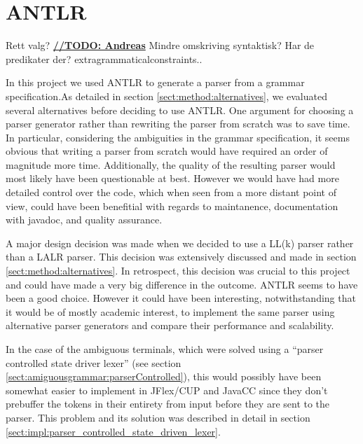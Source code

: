 \section{ANTLR}
Rett valg?
\underline{\textbf{\LARGE //TODO: Andreas}} Mindre omskriving syntaktisk? Har de predikater der? extragrammaticalconstraints..

In this project we used ANTLR to generate a parser from a grammar
specification.As detailed in section \ref{sect:method:alternatives}, we
evaluated several alternatives before deciding to use ANTLR. One argument for
choosing a parser generator rather than rewriting the parser from scratch was to
save time. In particular, considering the ambiguities in the grammar
specification, it seems obvious that writing a parser from scratch would
have required an order of magnitude more time. Additionally, the quality of the
resulting parser would most likely have been questionable at best. However
we would have had more detailed control over the code, which when seen from a
more distant point of view, could have been benefitial with regards to
maintanence, documentation with javadoc, and quality assurance.

A major design decision was made when we decided to use a LL(k) parser rather
than a LALR parser. This decision was extensively discussed and made in
section \ref{sect:method:alternatives}. In retrospect, this decision was
crucial to this project and could have made a very big difference in the
outcome. ANTLR seems to have been a good choice. However it could have been
interesting, notwithstanding that it would be of mostly academic interest, to  
implement the same parser using alternative parser generators and compare their
performance and scalability.

In the case of the ambiguous terminals, which were solved using a ``parser
controlled state driver lexer'' (see section 
\ref{sect:amiguousgrammar:parserControlled}), this would possibly have been
somewhat easier to implement in JFlex/CUP and JavaCC since they don't prebuffer 
the tokens in their entirety from input before they are sent to the parser. This
problem and its solution was described in detail in section
\ref{sect:impl:parser_controlled_state_driven_lexer}.